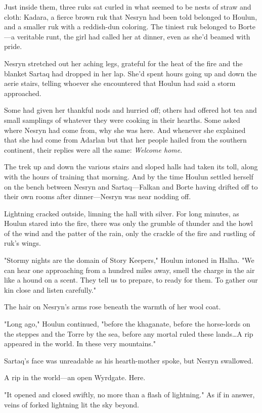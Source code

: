 Just inside them, three ruks sat curled in what seemed to be nests of straw and cloth: Kadara, a fierce brown ruk that Nesryn had been told belonged to Houlun, and a smaller ruk with a reddish-dun coloring.
The tiniest ruk belonged to Borte ---a veritable runt, the girl had called her at dinner, even as she'd beamed with pride.

Nesryn stretched out her aching legs, grateful for the heat of the fire and the blanket Sartaq had dropped in her lap.
She'd spent hours going up and down the aerie stairs, telling whoever she encountered that Houlun had said a storm approached.

Some had given her thankful nods and hurried off; others had offered hot tea and small samplings of whatever they were cooking in their hearths.
Some asked where Nesryn had come from, why she was here.
And whenever she explained that she had come from Adarlan but that her people hailed from the southern continent, their replies were all the same:
\emph{Welcome home}.

The trek up and down the various stairs and sloped halls had taken its toll, along with the hours of training that morning.
And by the time Houlun settled herself on the bench between Nesryn and Sartaq---Falkan and Borte having drifted off to their own rooms after dinner---Nesryn was near nodding off.

Lightning cracked outside, limning the hall with silver.
For long minutes, as Houlun stared into the fire, there was only the grumble of thunder and the howl of the wind and the patter of the rain, only the crackle of the fire and rustling of ruk's wings.

"Stormy nights are the domain of Story Keepers," Houlun intoned in Halha.
"We can hear one approaching from a hundred miles away, smell the charge in the air like a hound on a scent.
They tell us to prepare, to ready for them.
To gather our kin close and listen carefully."

The hair on Nesryn's arms rose beneath the warmth of her wool coat.

"Long ago," Houlun continued, "before the khaganate, before the horse-lords on the steppes and the Torre by the sea, before any mortal ruled these lands\ldots A rip appeared in the world.
In these very mountains."

Sartaq's face was unreadable as his hearth-mother spoke, but Nesryn swallowed.

A rip in the world---an open Wyrdgate.
Here.

"It opened and closed swiftly, no more than a flash of lightning."
As if in answer, veins of forked lightning lit the sky beyond.

